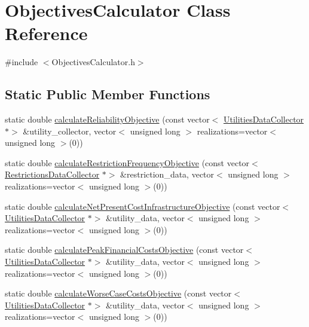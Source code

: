\hypertarget{classObjectivesCalculator}{}\section{Objectives\+Calculator Class Reference}
\label{classObjectivesCalculator}


{\ttfamily \#include $<$Objectives\+Calculator.\+h$>$}

\subsection*{Static Public Member Functions}
\begin{DoxyCompactItemize}
\item 
static double \mbox{\hyperlink{classObjectivesCalculator_a4cb12f9bb7861368c999d435477593c4}{calculate\+Reliability\+Objective}} (const vector$<$ \mbox{\hyperlink{classUtilitiesDataCollector}{Utilities\+Data\+Collector}} $\ast$$>$ \&utility\+\_\+collector, vector$<$ unsigned long $>$ realizations=vector$<$ unsigned long $>$(0))
\item 
static double \mbox{\hyperlink{classObjectivesCalculator_aba30dbaf1a1520282f81c683fe00b5ed}{calculate\+Restriction\+Frequency\+Objective}} (const vector$<$ \mbox{\hyperlink{classRestrictionsDataCollector}{Restrictions\+Data\+Collector}} $\ast$$>$ \&restriction\+\_\+data, vector$<$ unsigned long $>$ realizations=vector$<$ unsigned long $>$(0))
\item 
static double \mbox{\hyperlink{classObjectivesCalculator_a5619e4472f8e96bc6fa274002d4809f1}{calculate\+Net\+Present\+Cost\+Infrastructure\+Objective}} (const vector$<$ \mbox{\hyperlink{classUtilitiesDataCollector}{Utilities\+Data\+Collector}} $\ast$$>$ \&utility\+\_\+data, vector$<$ unsigned long $>$ realizations=vector$<$ unsigned long $>$(0))
\item 
static double \mbox{\hyperlink{classObjectivesCalculator_a2352c178eab40798324120102cc7891b}{calculate\+Peak\+Financial\+Costs\+Objective}} (const vector$<$ \mbox{\hyperlink{classUtilitiesDataCollector}{Utilities\+Data\+Collector}} $\ast$$>$ \&utility\+\_\+data, vector$<$ unsigned long $>$ realizations=vector$<$ unsigned long $>$(0))
\item 
static double \mbox{\hyperlink{classObjectivesCalculator_a74cf53d4a7abbb2ea34304844262a826}{calculate\+Worse\+Case\+Costs\+Objective}} (const vector$<$ \mbox{\hyperlink{classUtilitiesDataCollector}{Utilities\+Data\+Collector}} $\ast$$>$ \&utility\+\_\+data, vector$<$ unsigned long $>$ realizations=vector$<$ unsigned long $>$(0))
\end{DoxyCompactItemize}


